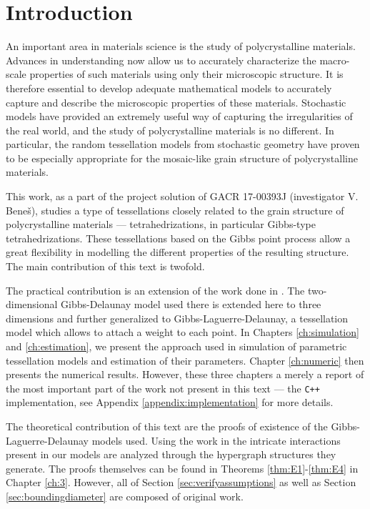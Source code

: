 \chapter*{Introduction}

An important area in materials science is the study of polycrystalline materials. Advances in understanding now allow us to accurately characterize the macro-scale properties of such materials using only their microscopic structure. It is therefore essential to develop adequate mathematical models to accurately capture and describe the microscopic properties of these materials.
Stochastic models have provided an extremely useful way of capturing the irregularities of the real world, and the study of polycrystalline materials is no different. In particular, the random tessellation models from stochastic geometry have proven to be especially appropriate for the mosaic-like grain structure of polycrystalline materials. 

This work, as a part of the project solution of GACR 17-00393J (investigator V. Bene\v{s}), studies a type of tessellations closely related to the grain structure of polycrystalline materials --- tetrahedrizations, in particular Gibbs-type tetrahedrizations. These tessellations based on the Gibbs point process allow a great flexibility in modelling the different properties of the resulting structure. 
The main contribution of this text is twofold. 


The practical contribution is an extension of the work done in \cite{DereudreLavancier2011}. The two-dimensional Gibbs-Delaunay model used there is extended here to three dimensions and further generalized to Gibbs-Laguerre-Delaunay, a tessellation model which allows to attach a weight to each point. In Chapters \ref{ch:simulation} and \ref{ch:estimation}, we present the approach used in simulation of parametric tessellation models and estimation of their parameters. Chapter \ref{ch:numeric} then presents the numerical results. However, these three chapters a merely a report of the most important part of the work not present in this text --- the \texttt{C++} implementation, see Appendix \ref{appendix:implementation} for more details. 

The theoretical contribution of this text are the proofs of existence of the Gibbs-Laguerre-Delaunay models used. Using the work in \cite{DDG12} the intricate interactions present in our models are analyzed through the hypergraph structures they generate. The proofs themselves can be found in Theorems \ref{thm:E1}-\ref{thm:E4} in Chapter \ref{ch:3}. However, all of Section \ref{sec:verifyassumptions} as well as Section \ref{sec:boundingdiameter} are composed of original work. 

